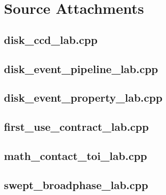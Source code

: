 \documentclass[11pt,twoside,openany]{book}
\begin{document}
\chapter{Source Attachments}
\hypertarget{source-file-887bbb1db2a031cbbf1eee43}{}
\label{attachmentstart:source-file-887bbb1db2a031cbbf1eee43}
\section*{disk\_ccd\_lab.cpp}
\hypertarget{source-file-ad26f703e8f150d27a72bf93}{}
\label{attachmentstart:source-file-ad26f703e8f150d27a72bf93}
\section*{disk\_event\_pipeline\_lab.cpp}
\hypertarget{source-file-50214a688c0ef812f3094877}{}
\label{attachmentstart:source-file-50214a688c0ef812f3094877}
\section*{disk\_event\_property\_lab.cpp}
\hypertarget{source-file-a41016f2e326b40cdff18ff4}{}
\label{attachmentstart:source-file-a41016f2e326b40cdff18ff4}
\section*{first\_use\_contract\_lab.cpp}
\hypertarget{source-file-c54e3c362767ccd1911378ae}{}
\label{attachmentstart:source-file-c54e3c362767ccd1911378ae}
\section*{math\_contact\_toi\_lab.cpp}
\hypertarget{source-file-6597829be009fc0bb1b17d87}{}
\label{attachmentstart:source-file-6597829be009fc0bb1b17d87}
\section*{swept\_broadphase\_lab.cpp}
\end{document}
